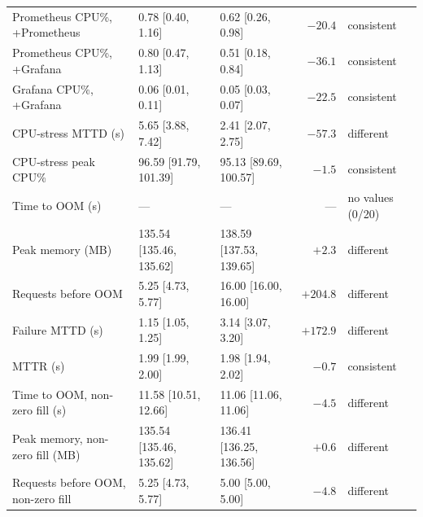 \begin{tabular}{lllrl}
Prometheus CPU\%, +Prometheus & 0.78 [0.40, 1.16] & 0.62 [0.26, 0.98] & $-20.4$ & consistent \\
Prometheus CPU\%, +Grafana & 0.80 [0.47, 1.13] & 0.51 [0.18, 0.84] & $-36.1$ & consistent \\
Grafana CPU\%, +Grafana & 0.06 [0.01, 0.11] & 0.05 [0.03, 0.07] & $-22.5$ & consistent \\
CPU-stress MTTD (s) & 5.65 [3.88, 7.42] & 2.41 [2.07, 2.75] & $-57.3$ & different \\
CPU-stress peak CPU\% & 96.59 [91.79, 101.39] & 95.13 [89.69, 100.57] & $-1.5$ & consistent \\
Time to OOM (s) & --- & --- & --- & no values (0/20) \\
Peak memory (MB) & 135.54 [135.46, 135.62] & 138.59 [137.53, 139.65] & $+2.3$ & different \\
Requests before OOM & 5.25 [4.73, 5.77] & 16.00 [16.00, 16.00] & $+204.8$ & different \\
Failure MTTD (s) & 1.15 [1.05, 1.25] & 3.14 [3.07, 3.20] & $+172.9$ & different \\
MTTR (s) & 1.99 [1.99, 2.00] & 1.98 [1.94, 2.02] & $-0.7$ & consistent \\
Time to OOM, non-zero fill (s) & 11.58 [10.51, 12.66] & 11.06 [11.06, 11.06] & $-4.5$ & different \\
Peak memory, non-zero fill (MB) & 135.54 [135.46, 135.62] & 136.41 [136.25, 136.56] & $+0.6$ & different \\
Requests before OOM, non-zero fill & 5.25 [4.73, 5.77] & 5.00 [5.00, 5.00] & $-4.8$ & different \\
\bottomrule
\end{tabular}
